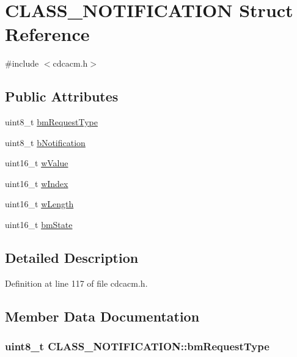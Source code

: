 \hypertarget{struct_c_l_a_s_s___n_o_t_i_f_i_c_a_t_i_o_n}{\section{\-C\-L\-A\-S\-S\-\_\-\-N\-O\-T\-I\-F\-I\-C\-A\-T\-I\-O\-N \-Struct \-Reference}
\label{struct_c_l_a_s_s___n_o_t_i_f_i_c_a_t_i_o_n}
}


{\ttfamily \#include $<$cdcacm.\-h$>$}

\subsection*{\-Public \-Attributes}
\begin{DoxyCompactItemize}
\item 
uint8\-\_\-t \hyperlink{struct_c_l_a_s_s___n_o_t_i_f_i_c_a_t_i_o_n_ad268e291db5485ca0869aeb66bc77d3c}{bm\-Request\-Type}
\item 
uint8\-\_\-t \hyperlink{struct_c_l_a_s_s___n_o_t_i_f_i_c_a_t_i_o_n_a158c134809e776056d50ffada8089e56}{b\-Notification}
\item 
uint16\-\_\-t \hyperlink{struct_c_l_a_s_s___n_o_t_i_f_i_c_a_t_i_o_n_ab55dc65ad3f5b47da89beeaf7c03b4bc}{w\-Value}
\item 
uint16\-\_\-t \hyperlink{struct_c_l_a_s_s___n_o_t_i_f_i_c_a_t_i_o_n_aae0d299b4d6e5ee396ace3f1b4cc7352}{w\-Index}
\item 
uint16\-\_\-t \hyperlink{struct_c_l_a_s_s___n_o_t_i_f_i_c_a_t_i_o_n_a7933669f6b6379d7ee0605f50422cbe2}{w\-Length}
\item 
uint16\-\_\-t \hyperlink{struct_c_l_a_s_s___n_o_t_i_f_i_c_a_t_i_o_n_a32bd53e2663570c57f78a91e2ebfc59c}{bm\-State}
\end{DoxyCompactItemize}


\subsection{\-Detailed \-Description}


\-Definition at line 117 of file cdcacm.\-h.



\subsection{\-Member \-Data \-Documentation}
\hypertarget{struct_c_l_a_s_s___n_o_t_i_f_i_c_a_t_i_o_n_ad268e291db5485ca0869aeb66bc77d3c}{
\subsubsection[{bm\-Request\-Type}]{\setlength{\rightskip}{0pt plus 5cm}uint8\-\_\-t {\bf \-C\-L\-A\-S\-S\-\_\-\-N\-O\-T\-I\-F\-I\-C\-A\-T\-I\-O\-N\-::bm\-Request\-Type}}}\label{struct_c_l_a_s_s___n_o_t_i_f_i_c_a_t_i_o_n_ad268e291db5485ca0869aeb66bc77d3c}


